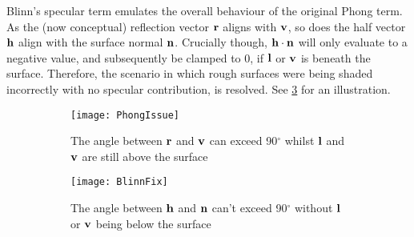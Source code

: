 Blinn's specular term emulates the overall behaviour of the original Phong term. As the (now conceptual) reflection vector \begin{math}\mathbf{r}\end{math} aligns with \begin{math}\mathbf{v}\end{math}, so does the half vector \begin{math}\mathbf{h}\end{math} align with the surface normal \begin{math}\mathbf{n}\end{math}. Crucially though, \begin{math}\mathbf{h}\cdot\mathbf{n}\end{math} will only evaluate to a negative value, and subsequently be clamped to 0, if \begin{math}\mathbf{l}\end{math} or \begin{math}\mathbf{v}\end{math} is beneath the surface. Therefore, the scenario in which rough surfaces were being shaded incorrectly with no specular contribution, is resolved. See \ref{fig:BlinnFix} for an illustration.

\begin{figure}[h]
	\begin{subfigure}{0.48\textwidth}
		\texttt{[image: PhongIssue]}
		\caption{The angle between \begin{math}\mathbf{r}\end{math} and \begin{math}\mathbf{v}\end{math} can exceed 90$^{\circ}$ whilst \begin{math}\mathbf{l}\end{math} and \begin{math}\mathbf{v}\end{math} are still above the surface}
		\label{fig:PhongIssue}
	\end{subfigure}
	\hspace*{\fill}
	\begin{subfigure}{0.48\textwidth}
		\texttt{[image: BlinnFix]}
		\caption{The angle between \begin{math}\mathbf{h}\end{math} and \begin{math}\mathbf{n}\end{math} can't exceed 90$^{\circ}$ without \begin{math}\mathbf{l}\end{math} or \begin{math}\mathbf{v}\end{math} being below the surface }
		\label{fig:BlinnFix}
	\end{subfigure}
	\caption{}
\end{figure}

